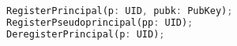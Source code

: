 \begin{figure}[t]
\begin{lstlisting}[language=Rust, style=rust]
RegisterPrincipal(p: UID, pubk: PubKey);
RegisterPseudoprincipal(pp: UID);
DeregisterPrincipal(p: UID);


\end{lstlisting}
\end{figure}
